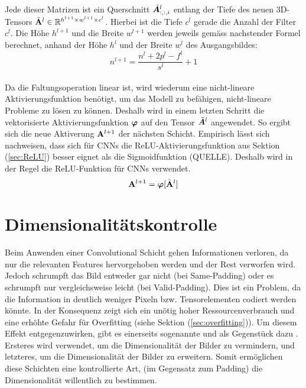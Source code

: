\\
Jede dieser Matrizen ist ein Querschnitt $\tilde{\bm{A}}^l_{:,:,i}$ entlang der
Tiefe des neuen 3D-Tensors $\tilde{\mathbf{A}}^l \in \mathbb{R}^{h^{l+1} \times w^{l+1} \times c^l}$.
Hierbei ist die Tiefe $c^l$ gerade die Anzahl der Filter $c^l$. Die Höhe
$h^{l+1}$ und die Breite $w^{l+1}$ werden jeweils gemäss nachstender Formel berechnet,
anhand der Höhe $h^l$ und der Breite $w^l$ des Ausgangsbildes:
\\
\begin{equation}
  n^{l+1} = \frac{n^l + 2p^l - f^l}{s^l} + 1
\end{equation}
\\
Da die Faltungsoperation linear ist, wird wiederum eine
nicht-lineare Aktivierungsfunktion benötigt, um das Modell zu befähigen, nicht-lineare Probleme zu
lösen zu können.
Deshalb wird in einem letzten Schritt die vektorisierte Aktivierungsfunktion
$\bm{\varphi}$ auf den Tensor $\tilde{\bm{A}}^l$ angewendet. So ergibt sich die
neue Aktiverung $\mathbf{A}^{l+1}$ der nächsten Schicht. Empirisch lässt sich nachweisen,
dass sich für CNNs die ReLU-Aktivierungsfunktion aus Sektion (\ref{sec:ReLU}) besser eignet als die
Sigmoidfunktion (QUELLE). Deshalb wird in der Regel die ReLU-Funktion für CNNs verwendet.
\begin{equation}
  \mathbf{A}^{l+1} = \bm{\varphi}[\tilde{\mathbf{A}}^l]
\end{equation}
\para{}
\cite{wiki:cnn}
\cite{deeplearning.ai:cnn}
\cite{Goodfellow-et-al-2016}
\cite{Nielsen}

\section{Dimensionalitätskontrolle}
Beim Anwenden einer Convolutional Schicht gehen Informationen verloren, da nur
die relevanten Features hervorgehoben werden und der Rest verworfen wird. Jedoch
schrumpft das Bild entweder gar nicht (bei Same-Padding) oder es schrumpft nur
vergleichsweise leicht (bei Valid-Padding). Dies ist ein Problem, da die Information in
deutlich weniger Pixeln bzw. Tensorelementen codiert werden könnte. In der Konsequenz
zeigt sich ein unötig hoher Ressourcenverbrauch und eine erhöhte Gefahr für
Overfitting (siehe Sektion (\ref{sec:overfitting})). Um diesem Effekt
entgegenzuwirken, gibt es einerseits sogenannte
 und als Gegenstück dazu
. Ersteres wird verwendet, um die Dimensionalität
der Bilder zu vermindern, und letzteres, um die Dimensionalität der Bilder zu
erweitern. Somit ermöglichen diese Schichten eine kontrollierte Art, (im Gegensatz zum
Padding) die Dimensionalität willentlich zu bestimmen.

